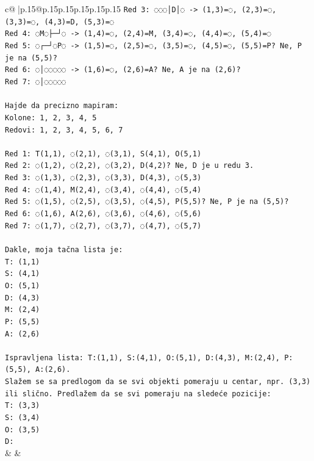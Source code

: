 \documentclass{article}
\begin{document}
{\begin{supertabular}{c@{$\;$}|p{.15\linewidth}@{}p{.15\linewidth}p{.15\linewidth}p{.15\linewidth}p{.15\linewidth}p{.15\linewidth}}
{{{\texttt{Red 3: ◌◌◌│D│◌ {-}> (1,3)=◌, (2,3)=◌, (3,3)=◌, (4,3)=D, (5,3)=◌} \\
\texttt{Red 4: ◌M◌├─┘◌ {-}> (1,4)=◌, (2,4)=M, (3,4)=◌, (4,4)=◌, (5,4)=◌} \\
\texttt{Red 5: ◌┌─┘◌P◌ {-}> (1,5)=◌, (2,5)=◌, (3,5)=◌, (4,5)=◌, (5,5)=P? Ne, P je na (5,5)?} \\
\texttt{Red 6: ◌│◌◌◌◌◌ {-}> (1,6)=◌, (2,6)=A? Ne, A je na (2,6)?} \\
\texttt{Red 7: ◌│◌◌◌◌◌} \\
\\ 
\texttt{Hajde da precizno mapiram:} \\
\texttt{Kolone: 1, 2, 3, 4, 5} \\
\texttt{Redovi: 1, 2, 3, 4, 5, 6, 7} \\
\\ 
\texttt{Red 1: T(1,1), ◌(2,1), ◌(3,1), S(4,1), O(5,1)} \\
\texttt{Red 2: ◌(1,2), ◌(2,2), ◌(3,2), D(4,2)? Ne, D je u redu 3.} \\
\texttt{Red 3: ◌(1,3), ◌(2,3), ◌(3,3), D(4,3), ◌(5,3)} \\
\texttt{Red 4: ◌(1,4), M(2,4), ◌(3,4), ◌(4,4), ◌(5,4)} \\
\texttt{Red 5: ◌(1,5), ◌(2,5), ◌(3,5), ◌(4,5), P(5,5)? Ne, P je na (5,5)?} \\
\texttt{Red 6: ◌(1,6), A(2,6), ◌(3,6), ◌(4,6), ◌(5,6)} \\
\texttt{Red 7: ◌(1,7), ◌(2,7), ◌(3,7), ◌(4,7), ◌(5,7)} \\
\\ 
\texttt{Dakle, moja tačna lista je:} \\
\texttt{T: (1,1)} \\
\texttt{S: (4,1)} \\
\texttt{O: (5,1)} \\
\texttt{D: (4,3)} \\
\texttt{M: (2,4)} \\
\texttt{P: (5,5)} \\
\texttt{A: (2,6)} \\
\\ 
\texttt{Ispravljena lista: T:(1,1), S:(4,1), O:(5,1), D:(4,3), M:(2,4), P:(5,5), A:(2,6).} \\
\texttt{Slažem se sa predlogom da se svi objekti pomeraju u centar, npr. (3,3) ili slično. Predlažem da se svi pomeraju na sledeće pozicije:} \\
\texttt{T: (3,3)} \\
\texttt{S: (3,4)} \\
\texttt{O: (3,5)} \\
\texttt{D:} \\
            }
        }
    }
    & & \\ \\


\end{supertabular}}
\end{document}
